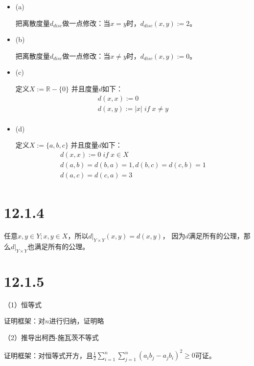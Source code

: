 \documentclass{article}
\begin{document}
\begin{itemize}
      \item (a)

            把离散度量$d_{disc}$做一点修改：当$x = y$时，$d_{disc}(x, y) := 2$。

      \item (b)

            把离散度量$d_{disc}$做一点修改：当$x \neq y$时，$d_{disc}(x, y) := 0$。

      \item (c)

            定义$X := \mathbb{R} - \{0\}$ 并且度量$d$如下：
            \begin{align*}
                  d(x, x) := 0                     \\
                  d(x, y) := |x| \; if \; x \neq y \\
            \end{align*}

      \item (d)

            定义$X := \{a, b, c\}$ 并且度量$d$如下：
            \begin{align*}
                  d(x, x) := 0 \; if \; x \in X               \\
                  d(a, b) = d(b, a) = 1, d(b,c) = d(c, b) = 1 \\
                  d(a, c) = d(c, a) = 3                       \\
            \end{align*}

\end{itemize}

\section*{12.1.4}

任意$x, y \in Y; x, y \in X$，所以$d|_{Y \times Y}(x, y) = d(x, y)$，
因为$d$满足所有的公理，那么$d|_{Y \times Y}$也满足所有的公理。

\section*{12.1.5}

（1）恒等式

证明框架：对$n$进行归纳，证明略

（2）推导出柯西-施瓦茨不等式

证明框架：对恒等式开方，且$\frac{1}{2} \sum \limits_{i=1}^n \sum \limits_{j=1}^n (a_ib_j - a_jb_i)^2 \geq 0$可证。
\end{document}
